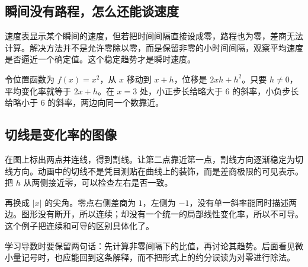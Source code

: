 \subsection*{瞬间没有路程，怎么还能谈速度}
速度表显示某个瞬间的速度，但若把时间间隔直接设成零，路程也为零，差商无法计算。解决方法并不是允许零除以零，而是保留非零的小时间间隔，观察平均速度是否逼近一个确定值。这个稳定趋势才是瞬时速度。

令位置函数为 $f(x)=x^2$，从 $x$ 移动到 $x+h$，位移是 $2xh+h^2$。只要 $h\ne0$，平均变化率就等于 $2x+h$。在 $x=3$ 处，小正步长给略大于 $6$ 的斜率，小负步长给略小于 $6$ 的斜率，两边向同一个数靠近。

\subsection*{切线是变化率的图像}
在图上标出两点并连线，得到割线。让第二点靠近第一点，割线方向逐渐稳定为切线方向。动画中的切线不是凭目测贴在曲线上的装饰，而是差商极限的可见表示。把 $h$ 从两侧接近零，可以检查左右是否一致。

再换成 $|x|$ 的尖角。零点右侧差商为 $1$，左侧为 $-1$，没有单一斜率能同时描述两边。图形没有断开，所以连续；却没有一个统一的局部线性变化率，所以不可导。这个例子把连续和可导的区别具体化了。

学习导数时要保留两句话：先计算非零间隔下的比值，再讨论其趋势。后面看见微小量记号时，也应能回到这条解释，而不把形式上的约分误读为对零进行除法。
